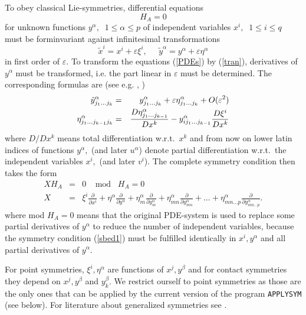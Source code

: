\documentclass[12pt]{article}
\begin{document}
To obey classical Lie-symmetries, differential equations
\begin{equation}
H_A = 0              \label{PDEs}
\end{equation}
for unknown functions $y^\alpha,\;\;1\leq \alpha \leq p$
of independent variables $x^i,\;\;1\leq i \leq q$
must be forminvariant against infinitesimal transformations
\begin{equation}
\tilde{x}^i = x^i + \varepsilon \xi^i, \;\; \;\;\;
        \tilde{y}^\alpha = y^\alpha + \varepsilon \eta^\alpha  \label{tran}
\end{equation}
in first order of $\varepsilon.$ To transform the equations (\ref{PDEs})
by (\ref{tran}), derivatives of $y^\alpha$ must be transformed, i.e. the part
linear in $\varepsilon$ must be determined. The corresponding formulas are
(see e.g. \cite{Olv}, \cite{Step})
\begin{eqnarray}
\tilde{y}^\alpha_{j_1\ldots j_k} & = &
y^\alpha_{j_1\ldots j_k} + \varepsilon
\eta^\alpha_{j_1\ldots j_k} + O(\varepsilon^2)  \nonumber \\ \vspace{3mm}
\eta^\alpha_{j_1\ldots j_{k-1}j_k} & = &
  \frac{D \eta^\alpha_{j_1\ldots j_{k-1}}}{D x^k} -
  y^\alpha_{ij_1\ldots j_{k-1}}\frac{D \xi^i}{D x^k} \label{recur}
\end{eqnarray}
where $D/Dx^k$ means total differentiation w.r.t.\ $x^k$ and
from now on lower latin indices of functions $y^\alpha,$ 
(and later $u^\alpha$)
denote partial differentiation w.r.t.\ the independent variables $x^i,$
(and later $v^i$).
The complete symmetry condition then takes the form
\begin{eqnarray}
X H_A & = & 0 \;\; \; \; \mbox{mod} \; \; \; H_A = 0\  \label{sbed1} \\
X & = & \xi^i \frac{\partial}{\partial x^i} +
 \eta^\alpha \frac{\partial}{\partial y^\alpha} +
 \eta^\alpha_m \frac{\partial}{\partial y^\alpha_m} +
 \eta^\alpha_{mn} \frac{\partial}{\partial y^\alpha_{mn}} + \ldots +
 \eta^\alpha_{mn\ldots p} \frac{\partial}{\partial y^\alpha_{mn\ldots p}}.
\label{sbed2}
\end{eqnarray}
where mod $H_A = 0$ means that the original PDE-system is used to replace
some partial derivatives of $y^\alpha$ to reduce the number of independent
variables, because the symmetry condition (\ref{sbed1}) must be
fulfilled identically in $x^i, y^\alpha$ and all partial
derivatives of $y^\alpha.$

For point symmetries, $\xi^i, \eta^\alpha$ are functions of $x^j,
y^\beta$ and for contact symmetries they depend on $x^j, y^\beta$ and
$y^\beta_k.$ We restrict ourself to point symmetries as those are the only
ones that can be applied by the current version of the program {\tt APPLYSYM}
(see below). For literature about generalized symmetries see \cite{WHer}.
\end{document}
